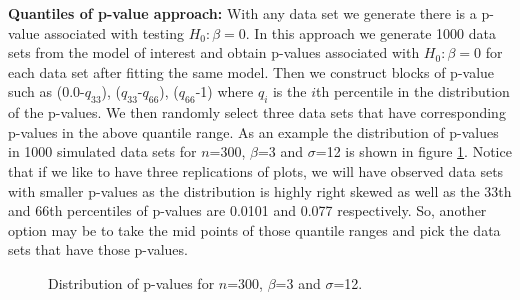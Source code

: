\documentclass[11pt]{article}
\begin{document}
{\bf Quantiles of p-value approach:} With any data set we generate there is a p-value associated with testing $H_0: \beta=0$. In this approach we generate 1000 data sets from the model of interest and obtain p-values associated with $H_0: \beta=0$ for each data set after fitting the same model. Then we construct blocks of p-value such as (0.0-$q_{33}$), ($q_{33}$-$q_{66}$), ($q_{66}$-1) where $q_i$ is the $i$th percentile in the distribution of the p-values. We then randomly select three data sets that have corresponding p-values in the above quantile range. As an example the distribution  of p-values in 1000 simulated data sets for $n$=300, $\beta$=3 and $\sigma$=12 is shown in figure \ref{fig:dist_pvalue}.  Notice that if we like to have three replications of plots, we will have observed data sets with smaller p-values as the distribution is highly right skewed as well as the 33th and 66th percentiles of p-values are 0.0101 and 0.077 respectively. So, another option may be to take the mid points of those quantile ranges and pick the data sets that have those p-values.\\

\begin{figure}[hbtp]
   \centering
       \caption{Distribution of p-values for $n$=300, $\beta$=3 and $\sigma$=12.}
       \label{fig:dist_pvalue}
\end{figure}
\end{document}
